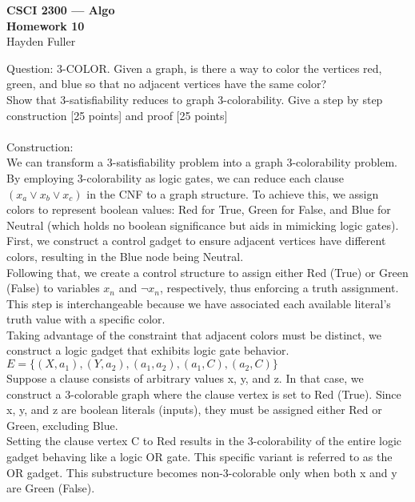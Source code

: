 \documentclass[11pt]{article}
\def\NOT{\neg}
\def\a{\alpha}
\def\b{\beta}
\def\g{\gamma}
\def\d{\delta}
\begin{document}
\thispagestyle{empty}   %


\begin{center}
\large
\textbf{CSCI 2300 --- Algo \\
Homework 10}
\\Hayden Fuller 
\end{center}
Question: 3-COLOR. Given a graph, is there a way to color the vertices red, green, and blue so that no adjacent vertices have the same color?
\\Show that 3-satisfiability reduces to graph 3-colorability. Give a step by step construction [25 points] and proof [25 points]
\\
\\Construction:
\\We can transform a 3-satisfiability problem into a graph 3-colorability problem. By employing 3-colorability as logic gates, we can reduce each clause $(x_a \vee x_b \vee x_c)$ in the CNF to a graph structure. To achieve this, we assign colors to represent boolean values: Red for True, Green for False, and Blue for Neutral (which holds no boolean significance but aids in mimicking logic gates). First, we construct a control gadget to ensure adjacent vertices have different colors, resulting in the Blue node being Neutral.
\\Following that, we create a control structure to assign either Red (True) or Green (False) to variables $x_n$ and $\NOT x_n$, respectively, thus enforcing a truth assignment. This step is interchangeable because we have associated each available literal's truth value with a specific color.
\\Taking advantage of the constraint that adjacent colors must be distinct, we construct a logic gadget that exhibits logic gate behavior. 
\\$E=\{(X,a_1), (Y,a_2), (a_1,a_2), (a_1,C), (a_2,C)\}$
\\Suppose a clause consists of arbitrary values x, y, and z. In that case, we construct a 3-colorable graph where the clause vertex is set to Red (True). Since x, y, and z are boolean literals (inputs), they must be assigned either Red or Green, excluding Blue.
\\Setting the clause vertex C to Red results in the 3-colorability of the entire logic gadget behaving like a logic OR gate. This specific variant is referred to as the OR gadget. This substructure becomes non-3-colorable only when both x and y are Green (False).
\end{document}
